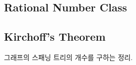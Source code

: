 \documentclass[8pt,landscape,a4paper,twocolumn]{article}
\begin{document}

\subsection{Rational Number Class}











\subsection{Kirchoff's Theorem}

그래프의 스패닝 트리의 개수를 구하는 정리.
\end{document}
